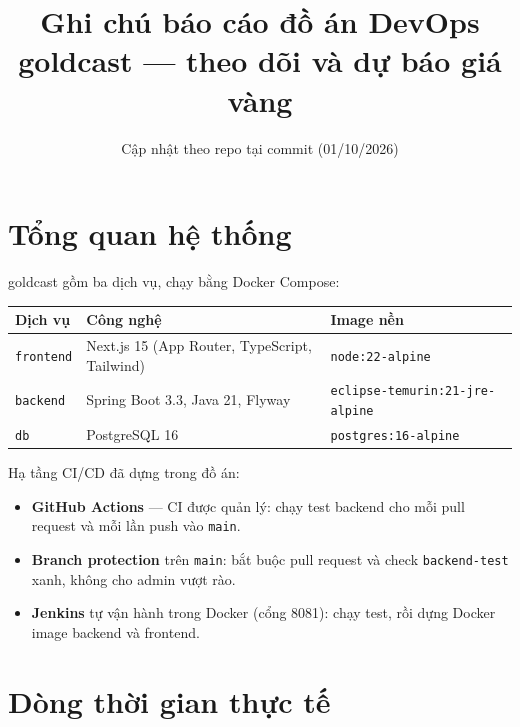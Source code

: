 \documentclass[12pt,a4paper]{article}
\title{Ghi chú báo cáo đồ án DevOps\\\large goldcast — theo dõi và dự báo giá vàng}
\author{\canbosung{Họ tên, MSSV, lớp}}
\date{Cập nhật theo repo tại commit \commit{3037e69} (01/10/2026)}
\begin{document}
\maketitle
\tableofcontents
\newpage

\section{Tổng quan hệ thống}

goldcast gồm ba dịch vụ, chạy bằng Docker Compose:

\begin{center}
\begin{tabularx}{\linewidth}{lXl}
\toprule
Dịch vụ & Công nghệ & Image nền \\
\midrule
\texttt{frontend} & Next.js 15 (App Router, TypeScript, Tailwind) & \texttt{node:22-alpine} \\
\texttt{backend}  & Spring Boot 3.3, Java 21, Flyway             & \texttt{eclipse-temurin:21-jre-alpine} \\
\texttt{db}       & PostgreSQL 16                                & \texttt{postgres:16-alpine} \\
\bottomrule
\end{tabularx}
\end{center}

Hạ tầng CI/CD đã dựng trong đồ án:

\begin{itemize}
  \item \textbf{GitHub Actions} — CI được quản lý: chạy test backend cho mỗi pull
        request và mỗi lần push vào \texttt{main}.
  \item \textbf{Branch protection} trên \texttt{main}: bắt buộc pull request và
        check \texttt{backend-test} xanh, không cho admin vượt rào.
  \item \textbf{Jenkins} tự vận hành trong Docker (cổng 8081): chạy test, rồi dựng
        Docker image backend và frontend.
\end{itemize}

\section{Dòng thời gian thực tế}
\end{document}
